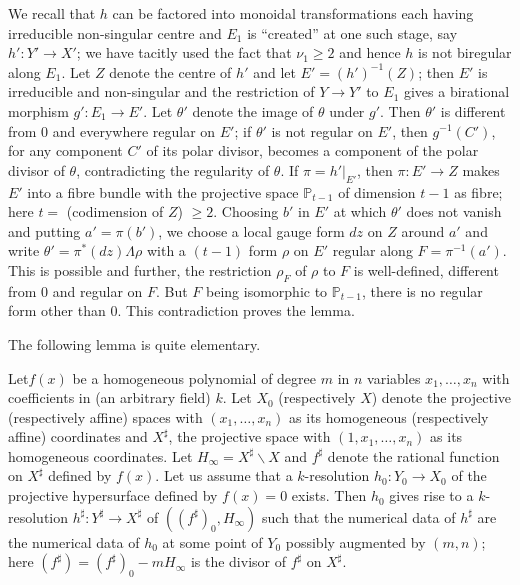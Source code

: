 We recall that $h$ can be factored into monoidal transformations each
having irreducible non-singular centre and $E_{1}$ is ``created'' at
one such stage, say $h':Y'\to X'$; we have tacitly used the fact that
$\nu_{1}\geq 2$ and hence $h$ is not biregular along $E_{1}$. Let $Z$
denote the centre of $h'$ and let $E'=(h')^{-1}(Z)$; then $E'$ is
irreducible and non-singular and the restriction of $Y\to Y'$ to
$E_{1}$ gives a birational morphism $g':E_{1}\to E'$. Let $\theta'$
denote the image of $\theta$ under $g'$. Then $\theta'$ is different
from $0$ and everywhere regular on $E'$; if $\theta'$ is not regular
on $E'$, then $g^{-1}(C')$, for any component $C'$ of its polar
divisor, becomes a component of the polar divisor of $\theta$,
contradicting the regularity of $\theta$. If $\pi=h'|_{E'}$, then
$\pi:E'\to Z$ makes $E'$ into a fibre bundle with the projective space
$\mathbb{P}_{t-1}$ of dimension $t-1$ as fibre; here $t=$ (codimension
of $Z$) $\geq 2$. Choosing $b'$ in $E'$ at which $\theta'$ does not
vanish and putting $a'=\pi(b')$, we choose a local gauge form $dz$ on
$Z$ around $a'$ and write $\theta'=\pi^{\ast}(dz)\Lambda\rho$ with a
$(t-1)$ form $\rho$ on $E'$ regular along $F=\pi^{-1}(a')$. This is
possible and further, the restriction $\rho_{F}$ of $\rho$ to $F$ is
well-defined, different from $0$ and regular on $F$. But $F$ being
isomorphic to $\mathbb{P}_{t-1}$, there is no regular form other than
$0$. This contradiction proves the lemma.

The following lemma is quite elementary.

\begin{lemma}\label{chap4:sec6:subsec1:lem2}  %
  Let\pageoriginale $f(x)$ be a homogeneous polynomial of degree $m$ in
  $n$ variables $x_{1},\ldots,x_{n}$ with coefficients in (an arbitrary
  field) $k$. Let $X_{0}$ (respectively $X$) denote the projective
  (respectively affine) spaces with $(x_{1},\ldots,x_{n})$ as its
  homogeneous (respectively affine) coordinates and $X^{\sharp}$, the
  projective space with $(1,x_{1},\ldots,x_{n})$ as its homogeneous
  coordinates. Let $H_{\infty}=X^{\sharp}\backslash X$ and $f^{\sharp}$
  denote the rational function on $X^{\sharp}$ defined by $f(x)$. Let us
  assume that a $k$-resolution $h_{0}:Y_{0}\to X_{0}$ of the projective
  hypersurface defined by $f(x)=0$ exists. Then $h_{0}$ gives rise to a
  $k$-resolution $h^{\sharp}:Y^{\sharp}\to X^{\sharp}$ of
  $((f^{\sharp})_{0},H_{\infty})$ such that the numerical data of
  $h^{\sharp}$ are the numerical data of $h_{0}$ at some point of
  $Y_{0}$ possibly augmented by $(m,n)$; here
  $(f^{\sharp})=(f^{\sharp})_{0}-mH_{\infty}$ is the divisor of
  $f^{\sharp}$ on $X^{\sharp}$. 
\end{lemma}

